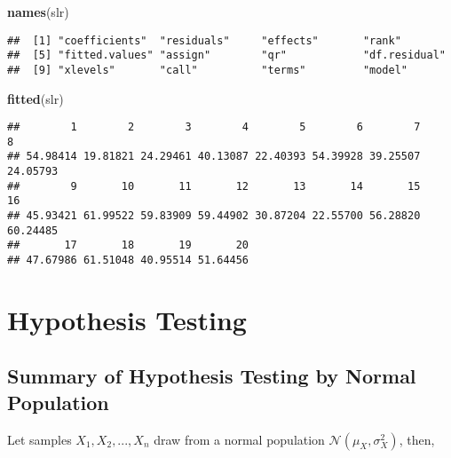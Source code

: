 \documentclass[
]{book}
\newenvironment{Shaded}{\begin{snugshade}}{\end{snugshade}}
\newcommand{\KeywordTok}[1]{\textcolor[rgb]{0.13,0.29,0.53}{\textbf{#1}}}
\newcommand{\NormalTok}[1]{#1}
\theoremstyle{definition}
\theoremstyle{definition}
\theoremstyle{definition}
\theoremstyle{remark}
\begin{document}
\begin{Shaded}
\begin{Highlighting}[]
\KeywordTok{names}\NormalTok{(slr)}
\end{Highlighting}
\end{Shaded}

\begin{verbatim}
##  [1] "coefficients"  "residuals"     "effects"       "rank"         
##  [5] "fitted.values" "assign"        "qr"            "df.residual"  
##  [9] "xlevels"       "call"          "terms"         "model"
\end{verbatim}

\begin{Shaded}
\begin{Highlighting}[]
\KeywordTok{fitted}\NormalTok{(slr)}
\end{Highlighting}
\end{Shaded}

\begin{verbatim}
##        1        2        3        4        5        6        7        8 
## 54.98414 19.81821 24.29461 40.13087 22.40393 54.39928 39.25507 24.05793 
##        9       10       11       12       13       14       15       16 
## 45.93421 61.99522 59.83909 59.44902 30.87204 22.55700 56.28820 60.24485 
##       17       18       19       20 
## 47.67986 61.51048 40.95514 51.64456
\end{verbatim}

\hypertarget{hypothesis-testing}{%
\chapter{Hypothesis Testing}\label{hypothesis-testing}}

\hypertarget{summary-of-hypothesis-testing-by-normal-population}{%
\section{Summary of Hypothesis Testing by Normal Population}\label{summary-of-hypothesis-testing-by-normal-population}}

Let samples \(X_1,X_2,...,X_n\) draw from a normal population \(\mathcal{N}(\mu_X,\sigma^2_X)\), then,
\end{document}
